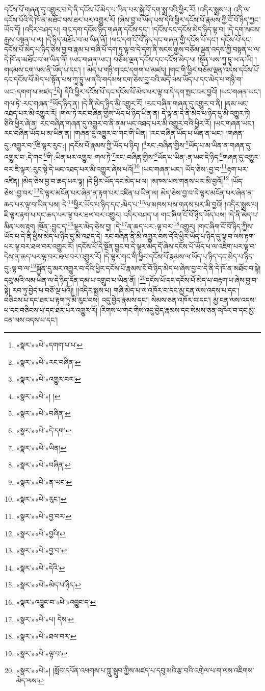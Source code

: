 དངོས་པོ་གཞན་དུ་འགྱུར་བ་དེ་ནི་དངོས་པོ་མེད་པ་ཡིན་པར་སྐྱེ་བོ་དག་སྨྲ་བའི་ཕྱིར་རོ། །འདིར་སྨྲས་པ། འདི་ལ་དངོས་པོའི་དེ་ཁོ་ན་མཐོང་བས་ཐར་པར་འགྱུར་རོ། །ཞེས་བྱ་བ་ཡོད་པས་དེའི་ཕྱིར་དངོས་པོ་རྣམས་ཀྱི་ངོ་བོ་ཉིད་ཀྱང་ཡོད་དོ། །འདིར་བཤད་པ། གང་དག་དངོས་ཉིད་གཞན་དངོས་དང་། །དངོས་དང་དངོས་མེད་ཉིད་ལྟ་བ། །དེ་དག་སངས་རྒྱས་བསྟན་པ་ལ། །དེ་ཉིད་མཐོང་བ་མ་ཡིན་ནོ། །གང་དག་ངོ་བོ་ཉིད་དང་གཞན་གྱི་དངོས་པོ་དང་། དངོས་པོ་དང་དངོས་པོ་མེད་པ་ཉིད་ཅེས་བྱ་བ་རྣམ་པ་བཞི་པོ་དག་ཏུ་ལྟ་བ་དེ་དག་ནི་སངས་རྒྱས་བཅོམ་ལྡན་འདས་ཀྱི་བསྟན་པ་ལ་དེ་ཁོ་ན་མཐོང་བ་མ་ཡིན་ནོ། །ཡང་གཞན་ཡང་། བཅོམ་ལྡན་དངོས་དང་དངོས་མེད་པ། །སྟོན་པས་ཀཱ་ཏྱཱ་ཡ་ན་ཡི། །གདམས་ངག་ལས་ནི་ཡོད་པ་དང་། །
མེད་པ་གཉི་གའང་དགག་པ་མཛད། །གང་གི་ཕྱིར་བཅོམ་ལྡན་འདས་དངོས་པོ་དང་དངོས་པོ་མེད་པ་སྟོན་པས་ཀཱ་ཏྱཱ་ཡ་ནའི་གདམས་ངག་ཅེས་བྱ་བའི་མདོ་ལས་ཡོད་པ་དང་མེད་པ་གཉི་ག་ཡང་:དགག་པ་མཛད་\footnote{«སྣར་»«པེ་»དགག་པ་པ་}དེ། དེའི་ཕྱིར་དངོས་པོ་དང་དངོས་པོ་མེད་པར་ལྟ་བ་དེ་དག་སྤང་བར་བྱའོ། །ཡང་གཞན་ཡང་། གལ་ཏེ་:རང་གཞན་\footnote{«སྣར་»«པེ་»རང་བཞིན་}ཡོད་ཉིད་ན། །དེ་ནི་མེད་ཉིད་མི་འགྱུར་རོ། །རང་བཞིན་གཞན་དུ་འགྱུར་བ་ནི། །ནམ་ཡང་འཐད་པར་མི་འགྱུར་རོ། །གལ་ཏེ་རང་བཞིན་གྱིས་ཡོད་པ་ཉིད་ཡིན་ན། དེ་ལྟ་ན་དེ་ནི་མེད་པ་ཉིད་དུ་མི་འགྱུར་ཏེ། ཅིའི་ཕྱིར་ཞེ་ན། རང་བཞིན་གཞན་དུ་འགྱུར་བ་ནི་ནམ་ཡང་འཐད་པར་མི་འགྱུར་བའི་ཕྱིར་རོ། །ཡང་གཞན་ཡང་། རང་བཞིན་ཡོད་པ་མ་ཡིན་ན། །གཞན་དུ་འགྱུར་བ་གང་གི་ཡིན། །རང་བཞིན་ཡོད་པ་ཡིན་ན་ཡང་། །གཞན་དུ་:འགྱུར་བ་\footnote{«སྣར་»«པེ་»འགྱུར་བར་}ཇི་ལྟར་རུང་:། །དངོས་པོ་རྣམས་ཀྱི་ཡོད་པ་ཉིད། །\footnote{«སྣར་»«པེ་»། །}རང་:བཞིན་གྱིས་\footnote{«སྣར་»«པེ་»བཞིན་}ཡོད་པ་མ་ཡིན་ན་གཞན་དུ་འགྱུར་བ་:དེ་གང་\footnote{«སྣར་»«པེ་»དེ་དག་}གི་:ཡིན་པར་འགྱུར། གལ་ཏེ་\footnote{«སྣར་»«པེ་»ཡིན། }རང་:བཞིན་གྱིས་\footnote{«སྣར་»«པེ་»བཞིན་}ཡོད་པ་ཡིན་:ན་ཡང་དེ་ཉིད་\footnote{«སྣར་»«པེ་»ན་ཡང་}གཞན་དུ་འགྱུར་བར་ཇི་ལྟར་:རུང་སྟེ་དེ་ཡང་འཐད་པར་མི་འགྱུར་ཞེས་པའོ།\footnote{«སྣར་»«པེ་»རུང་།} །ཡང་གཞན་ཡང་། ཡོད་ཅེས་:བྱ་བ་\footnote{«སྣར་»«པེ་»བྱ་བར་}རྟག་པར་འཛིན། །མེད་ཅེས་བྱ་བ་ཆད་པར་ལྟ། །དེ་ཕྱིར་ཡོད་དང་མེད་པ་ལ། །མཁས་པས་གནས་པར་མི་བྱའོ།\footnote{«སྣར་»«པེ་»བྱའི།} །ཡོད་ཅེས་:བྱ་བར་\footnote{«སྣར་»«པེ་»བྱ་བ་}དེ་ལྟར་མངོན་པར་ཞེན་ན་རྟག་པར་འཛིན་པ་ཡིན་ལ། མེད་ཅེས་བྱ་བ་དེ་ལྟར་མངོན་པར་ཞེན་ན་ཆད་པར་ལྟ་བ་ཡིན་པས། དེ་\footnote{«སྣར་»«པེ་»དེའི་}ཕྱིར་ཡོད་པ་ཉིད་དང་:མེད་པ་\footnote{«སྣར་»«པེ་»མེད་པ་ཉིད་}ལ་མཁས་པས་གནས་པར་མི་བྱའོ། །འདིར་སྨྲས་པ། ཇི་ལྟར་རྟག་པ་དང་ཆད་པར་ལྟ་བར་ཐལ་བར་འགྱུར། འདིར་བཤད་པ། གང་ཞིག་ངོ་བོ་ཉིད་ཡོད་པས། །དེ་ནི་མེད་པ་མིན་པས་རྟག །སྔོན་:བྱུང་ད་\footnote{«སྣར་»འབྱུང་བ་«པེ་»འབྱུང་ད་}ལྟར་མེད་ཅེས་བྱ། །དེ་\footnote{«སྣར་»«པེ་»པ། དེས་}ན་ཆད་པར་:ལྟ་བར་\footnote{«སྣར་»«པེ་»ཐལ་བར་}འགྱུར། །གང་ཞིག་ངོ་བོ་ཉིད་ཀྱིས་ཡོད་པ་དེ་ནི་ཕྱིས་མེད་པ་ཉིད་དུ་མི་འཐད་དེ། རང་བཞིན་ནི་མི་འགྱུར་བས་དེའི་ཕྱིར་ཡོད་པ་ཉིད་དུ་ལྟ་བ་ལས་རྟག་པར་ལྟ་བར་ཐལ་བར་འགྱུར་རོ། །དངོས་པོ་དེ་སྔོན་བྱུང་བ་དེ་ལྟར་མེད་དོ་ཞེས་དངོས་པོ་ཡོད་པ་ལ་འཇིག་པར་ལྟ་བ་དེས་ན་ཆད་པར་ལྟ་བར་ཐལ་བར་འགྱུར་རོ། །དེ་ལྟར་གང་གི་ཕྱིར་དངོས་པོ་རྣམས་ལ་ཡོད་པ་ཉིད་དང་མེད་པ་ཉིད་དུ་:ལྟ་བ་ལ་\footnote{«སྣར་»«པེ་»ལྟ་བ་}སྐྱོན་དུ་མར་འགྱུར་བ་དེའི་ཕྱིར་དངོས་པོ་རྣམས་ངོ་བོ་ཉིད་མེད་པ་ཞེས་བྱ་བ་དེ་ནི་དེ་ཁོ་ན་མཐོང་བ་སྟེ། དབུ་མའི་ལམ་ཡིན་ལ་དེ་ཉིད་དོན་དམ་པ་འགྲུབ་པ་ཡིན་ནོ། །\footnote{«སྣར་»«པེ་»། །སློབ་དཔོན་འཕགས་པ་ཀླུ་སྒྲུབ་ཀྱིས་མཛད་པ་དབུ་མའི་རྩ་བའི་འགྲེལ་པ་ག་ལས་འཇིགས་མེད་ལས་}དངོས་པོ་དང་དངོས་པོ་མེད་པ་བརྟག་པ་ཞེས་བྱ་བ་སྟེ། རབ་ཏུ་བྱེད་པ་བཅོ་ལྔ་པའོ།། །།འདིར་སྨྲས་པ། གཞི་མེད་པ་ལ་འཁོར་བ་དང་མྱ་ངན་ལས་འདས་པ་དང་། བཅིངས་པ་དང་ཐར་པ་རྟག་ཏུ་མི་རུང་བས། འདུ་བྱེད་རྣམས་དང་། སེམས་ཅན་འཁོར་བ་དང་། མྱ་ངན་ལས་འདས་པ་དང་བཅིངས་པ་དང་ཐར་པར་འགྱུར་རོ། །རིགས་པ་གང་གིས་འདུ་བྱེད་རྣམས་དང་སེམས་ཅན་འཁོར་བ་དང་མྱ་ངན་ལས་འདས་པ་དང་། 